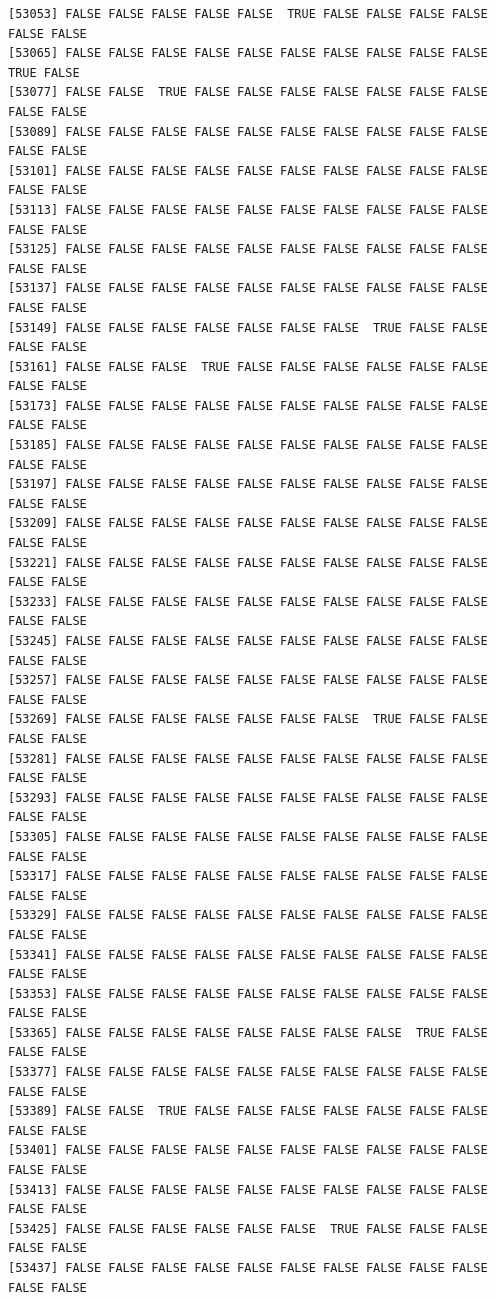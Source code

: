 \documentclass[
  a4paper,
  DIV=11,
  numbers=noendperiod]{scrartcl}
\begin{document}
\begin{verbatim}
[53053] FALSE FALSE FALSE FALSE FALSE  TRUE FALSE FALSE FALSE FALSE FALSE FALSE
[53065] FALSE FALSE FALSE FALSE FALSE FALSE FALSE FALSE FALSE FALSE  TRUE FALSE
[53077] FALSE FALSE  TRUE FALSE FALSE FALSE FALSE FALSE FALSE FALSE FALSE FALSE
[53089] FALSE FALSE FALSE FALSE FALSE FALSE FALSE FALSE FALSE FALSE FALSE FALSE
[53101] FALSE FALSE FALSE FALSE FALSE FALSE FALSE FALSE FALSE FALSE FALSE FALSE
[53113] FALSE FALSE FALSE FALSE FALSE FALSE FALSE FALSE FALSE FALSE FALSE FALSE
[53125] FALSE FALSE FALSE FALSE FALSE FALSE FALSE FALSE FALSE FALSE FALSE FALSE
[53137] FALSE FALSE FALSE FALSE FALSE FALSE FALSE FALSE FALSE FALSE FALSE FALSE
[53149] FALSE FALSE FALSE FALSE FALSE FALSE FALSE  TRUE FALSE FALSE FALSE FALSE
[53161] FALSE FALSE FALSE  TRUE FALSE FALSE FALSE FALSE FALSE FALSE FALSE FALSE
[53173] FALSE FALSE FALSE FALSE FALSE FALSE FALSE FALSE FALSE FALSE FALSE FALSE
[53185] FALSE FALSE FALSE FALSE FALSE FALSE FALSE FALSE FALSE FALSE FALSE FALSE
[53197] FALSE FALSE FALSE FALSE FALSE FALSE FALSE FALSE FALSE FALSE FALSE FALSE
[53209] FALSE FALSE FALSE FALSE FALSE FALSE FALSE FALSE FALSE FALSE FALSE FALSE
[53221] FALSE FALSE FALSE FALSE FALSE FALSE FALSE FALSE FALSE FALSE FALSE FALSE
[53233] FALSE FALSE FALSE FALSE FALSE FALSE FALSE FALSE FALSE FALSE FALSE FALSE
[53245] FALSE FALSE FALSE FALSE FALSE FALSE FALSE FALSE FALSE FALSE FALSE FALSE
[53257] FALSE FALSE FALSE FALSE FALSE FALSE FALSE FALSE FALSE FALSE FALSE FALSE
[53269] FALSE FALSE FALSE FALSE FALSE FALSE FALSE  TRUE FALSE FALSE FALSE FALSE
[53281] FALSE FALSE FALSE FALSE FALSE FALSE FALSE FALSE FALSE FALSE FALSE FALSE
[53293] FALSE FALSE FALSE FALSE FALSE FALSE FALSE FALSE FALSE FALSE FALSE FALSE
[53305] FALSE FALSE FALSE FALSE FALSE FALSE FALSE FALSE FALSE FALSE FALSE FALSE
[53317] FALSE FALSE FALSE FALSE FALSE FALSE FALSE FALSE FALSE FALSE FALSE FALSE
[53329] FALSE FALSE FALSE FALSE FALSE FALSE FALSE FALSE FALSE FALSE FALSE FALSE
[53341] FALSE FALSE FALSE FALSE FALSE FALSE FALSE FALSE FALSE FALSE FALSE FALSE
[53353] FALSE FALSE FALSE FALSE FALSE FALSE FALSE FALSE FALSE FALSE FALSE FALSE
[53365] FALSE FALSE FALSE FALSE FALSE FALSE FALSE FALSE  TRUE FALSE FALSE FALSE
[53377] FALSE FALSE FALSE FALSE FALSE FALSE FALSE FALSE FALSE FALSE FALSE FALSE
[53389] FALSE FALSE  TRUE FALSE FALSE FALSE FALSE FALSE FALSE FALSE FALSE FALSE
[53401] FALSE FALSE FALSE FALSE FALSE FALSE FALSE FALSE FALSE FALSE FALSE FALSE
[53413] FALSE FALSE FALSE FALSE FALSE FALSE FALSE FALSE FALSE FALSE FALSE FALSE
[53425] FALSE FALSE FALSE FALSE FALSE FALSE  TRUE FALSE FALSE FALSE FALSE FALSE
[53437] FALSE FALSE FALSE FALSE FALSE FALSE FALSE FALSE FALSE FALSE FALSE FALSE

\end{verbatim}
\end{document}
